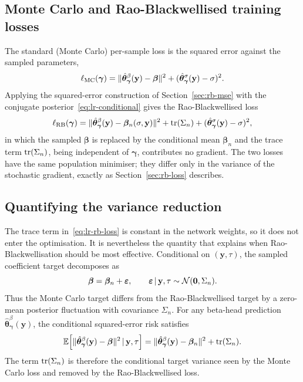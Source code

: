 \subsection{Monte Carlo and Rao-Blackwellised training losses}
\label{sec:lr-losses}

The standard (Monte Carlo) per-sample loss is the squared error
against the sampled parameters,
%
\begin{equation}
  \ell_{\mathrm{MC}}(\bm{\gamma})
  = \|\hat{\bm{\theta}}_{\bm{\gamma}}^{\beta}(\mathbf{y}) - \bm{\beta}\|^2
  + (\hat{\bm{\theta}}_{\bm{\gamma}}^{\sigma}(\mathbf{y}) - \sigma)^2.
  \label{eq:lr-mc-loss}
\end{equation}
%
Applying the squared-error construction of
Section~\ref{sec:rb-mse} with the conjugate
posterior~\eqref{eq:lr-conditional} gives the Rao-Blackwellised loss
%
\begin{equation}
  \ell_{\mathrm{RB}}(\bm{\gamma})
  = \|\hat{\bm{\theta}}_{\bm{\gamma}}^{\beta}(\mathbf{y})
      - \bm{\beta}_n(\sigma, \mathbf{y})\|^2
  + \operatorname{tr}(\Sigma_n)
  + (\hat{\bm{\theta}}_{\bm{\gamma}}^{\sigma}(\mathbf{y}) - \sigma)^2,
  \label{eq:lr-rb-loss}
\end{equation}
%
in which the sampled $\bm{\beta}$ is replaced by the conditional mean
$\bm{\beta}_n$ and the trace term $\operatorname{tr}(\Sigma_n)$, being independent
of $\bm{\gamma}$, contributes no gradient. The two losses have the
same population minimiser; they differ only in the variance of the
stochastic gradient, exactly as Section~\ref{sec:rb-loss} describes.

\subsection{Quantifying the variance reduction}
\label{sec:lr-variance-reduction}

The trace term in~\eqref{eq:lr-rb-loss} is constant in the network
weights, so it does not enter the optimisation. It is nevertheless
the quantity that explains when Rao-Blackwellisation should be most
effective. Conditional on $(\mathbf{y},\tau)$, the sampled coefficient
target decomposes as
%
\begin{equation}
  \bm{\beta}
  =
  \bm{\beta}_n
  +
  \bm{\varepsilon},
  \qquad
  \bm{\varepsilon} \,|\, \mathbf{y},\tau
  \sim
  \mathcal{N}(\mathbf{0},\Sigma_n).
\end{equation}
%
Thus the Monte Carlo target differs from the Rao-Blackwellised target
by a zero-mean posterior fluctuation with covariance $\Sigma_n$. For
any beta-head prediction
$\hat{\bm{\theta}}_{\bm{\gamma}}^\beta(\mathbf{y})$, the conditional
squared-error risk satisfies
%
\begin{equation}
  \mathbb{E}\!\left[
  \|\hat{\bm{\theta}}_{\bm{\gamma}}^\beta(\mathbf{y})-\bm{\beta}\|^2
  \,|\, \mathbf{y},\tau
  \right]
  =
  \|\hat{\bm{\theta}}_{\bm{\gamma}}^\beta(\mathbf{y})-\bm{\beta}_n\|^2
  +
  \operatorname{tr}(\Sigma_n).
  \label{eq:lr-target-noise}
\end{equation}
%
The term $\operatorname{tr}(\Sigma_n)$ is therefore the conditional target variance
seen by the Monte Carlo loss and removed by the Rao-Blackwellised loss.

